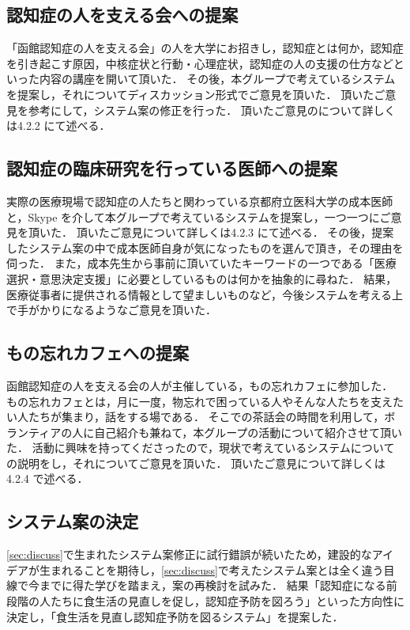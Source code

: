 \documentclass[../report]{subfiles}
\begin{document}
    \subsection{認知症の人を支える会への提案}
    「函館認知症の人を支える会」の人を大学にお招きし，認知症とは何か，認知症を引き起こす原因，中核症状と行動・心理症状，認知症の人の支援の仕方などといった内容の講座を開いて頂いた．
    その後，本グループで考えているシステムを提案し，それについてディスカッション形式でご意見を頂いた．
    頂いたご意見を参考にして，システム案の修正を行った．
    頂いたご意見のについて詳しくは4.2.2 にて述べる．
    
    \subsection{認知症の臨床研究を行っている医師への提案}
    実際の医療現場で認知症の人たちと関わっている京都府立医科大学の成本医師と，Skype を介して本グループで考えているシステムを提案し，一つ一つにご意見を頂いた．
    頂いたご意見について詳しくは4.2.3 にて述べる．
    その後，提案したシステム案の中で成本医師自身が気になったものを選んで頂き，その理由を伺った．
    また，成本先生から事前に頂いていたキーワードの一つである「医療選択・意思決定支援」に必要としているものは何かを抽象的に尋ねた．
    結果，医療従事者に提供される情報として望ましいものなど，今後システムを考える上で手がかりになるようなご意見を頂いた．
    
    \subsection{もの忘れカフェへの提案} \label{sec:propose_cafe}
    函館認知症の人を支える会の人が主催している，もの忘れカフェに参加した．
    もの忘れカフェとは，月に一度，物忘れで困っている人やそんな人たちを支えたい人たちが集まり，話をする場である．
    そこでの茶話会の時間を利用して，ボランティアの人に自己紹介も兼ねて，本グループの活動について紹介させて頂いた．
    活動に興味を持ってくださったので，現状で考えているシステムについての説明をし，それについてご意見を頂いた．
    頂いたご意見について詳しくは4.2.4 で述べる．
    
    \subsection{システム案の決定} \label{sec:decision}
    \ref{sec:discuss}で生まれたシステム案修正に試行錯誤が続いたため，建設的なアイデアが生まれることを期待し，\ref{sec:discuss}で考えたシステム案とは全く違う目線で今までに得た学びを踏まえ，案の再検討を試みた．
    結果「認知症になる前段階の人たちに食生活の見直しを促し，認知症予防を図ろう」といった方向性に決定し，「食生活を見直し認知症予防を図るシステム」を提案した．
    
\end{document}
